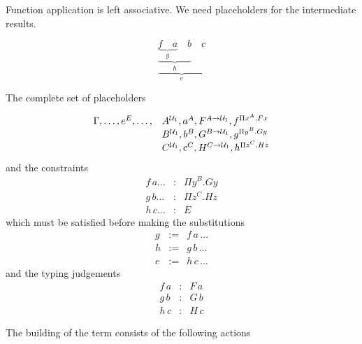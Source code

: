 Function application is left associative. We need placeholders for the
intermediate results.

$$
\underbrace{\underbrace {\underbrace {f \quad a}_g \quad b}_h \quad c}_e
$$


The complete set of placeholders

$$
\begin{array}{ll}
\Gamma, \ldots, e^E, \ldots,

& A^{\Any_1}, a^A, F^{A\to\Any_1}, f^{\Pi x^A. F x}

\\

& B^{\Any_1}, b^B, G^{B\to\Any_1}, g^{\Pi y^B. G y}
\\

& C^{\Any_1}, c^C, H^{C\to\Any_1}, h^{\Pi z^C. H z}
\end{array}
$$
%
and the constraints
$$
\begin{array}{lll}

f \, a \ldots &:& \Pi y^B. G y

\\

g \, b \ldots &:& \Pi z^C. H z

\\

h \, c \ldots &:& E

\end{array}
$$
which must be satisfied before making the substitutions
$$
\begin{array}{lll}
g &:=& f \, a \,\ldots

\\

h &:=& g \, b \,\ldots

\\

e &:=& h \, c \,\ldots
\end{array}
$$
%
and the typing judgements
$$
\begin{array}{lll}

f \, a &:& F \, a

\\

g \, b &:& G \, b

\\

h \, c &:& H \, c
\end{array}
$$


The building of the term consists of the following actions

